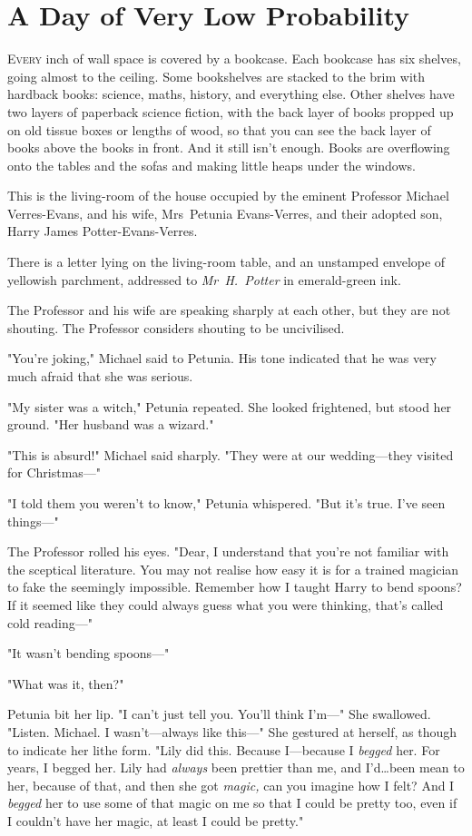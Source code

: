 \chapter{A Day of Very Low Probability}

\lettrine{E}{very} inch of wall space is covered by a bookcase. Each bookcase has six
shelves, going almost to the ceiling. Some bookshelves are stacked to the brim
with hardback books: science, maths, history, and everything else. Other
shelves have two layers of paperback science fiction, with the back layer of
books propped up on old tissue boxes or lengths of wood, so that you can see
the back layer of books above the books in front. And it still isn't enough.
Books are overflowing onto the tables and the sofas and making little heaps
under the windows.

This is the living-room of the house occupied by the eminent Professor Michael
Verres-Evans, and his wife, Mrs~Petunia Evans-Verres, and their adopted son,
Harry James Potter-Evans-Verres.

There is a letter lying on the living-room table, and an unstamped envelope of
yellowish parchment, addressed to \emph{Mr~H.~Potter} in emerald-green ink.

The Professor and his wife are speaking sharply at each other, but they are not
shouting. The Professor considers shouting to be uncivilised.

"You're joking," Michael said to Petunia. His tone indicated that he was very
much afraid that she was serious.

"My sister was a witch," Petunia repeated. She looked frightened, but stood her
ground. "Her husband was a wizard."

"This is absurd!" Michael said sharply. "They were at our wedding—they
visited for Christmas—"

"I told them you weren't to know," Petunia whispered. "But it's true. I've seen
things—"

The Professor rolled his eyes. "Dear, I understand that you're not familiar
with the sceptical literature. You may not realise how easy it is for a trained
magician to fake the seemingly impossible. Remember how I taught Harry to bend
spoons? If it seemed like they could always guess what you were thinking,
that's called cold reading—"

"It wasn't bending spoons—"

"What was it, then?"

Petunia bit her lip. "I can't just tell you. You'll think I'm—" She
swallowed. "Listen. Michael. I wasn't—always like this—" She gestured at
herself, as though to indicate her lithe form. "Lily did this. Because
I—because I \emph{begged} her. For years, I begged her. Lily had
\emph{always} been prettier than me, and I'd…been mean to her, because
of that, and then she got \emph{magic,} can you imagine how I felt? And I
\emph{begged} her to use some of that magic on me so that I could be pretty
too, even if I couldn't have her magic, at least I could be pretty."

